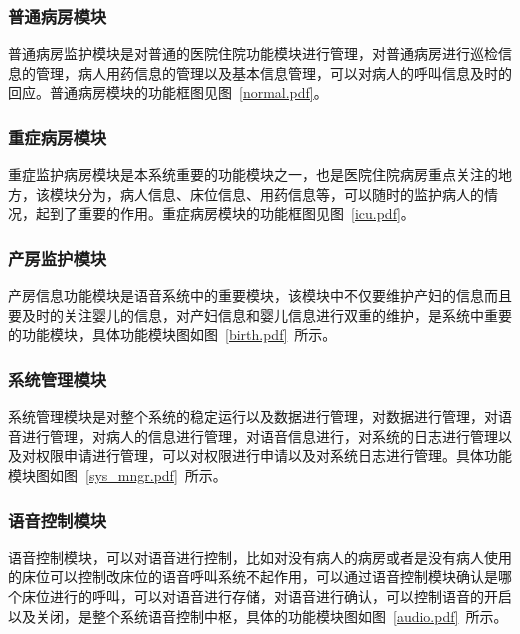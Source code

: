 \subsubsection{普通病房模块}
普通病房监护模块是对普通的医院住院功能模块进行管理，对普通病房进行巡检信息的管理，病人用药信息的管理以及基本信息管理，可以对病人的呼叫信息及时的回应。普通病房模块的功能框图见图~\ref{normal.pdf}。

\subsubsection{重症病房模块}
重症监护病房模块是本系统重要的功能模块之一，也是医院住院病房重点关注的地方，该模块分为，病人信息、床位信息、用药信息等，可以随时的监护病人的情况，起到了重要的作用。重症病房模块的功能框图见图~\ref{icu.pdf}。

\subsubsection{产房监护模块}
产房信息功能模块是语音系统中的重要模块，该模块中不仅要维护产妇的信息而且要及时的关注婴儿的信息，对产妇信息和婴儿信息进行双重的维护，是系统中重要的功能模块，具体功能模块图如图~\ref{birth.pdf}~所示。

\subsubsection{系统管理模块}
系统管理模块是对整个系统的稳定运行以及数据进行管理，对数据进行管理，对语音进行管理，对病人的信息进行管理，对语音信息进行，对系统的日志进行管理以及对权限申请进行管理，可以对权限进行申请以及对系统日志进行管理。具体功能模块图如图~\ref{sys_mngr.pdf}~所示。
	
\subsubsection{语音控制模块}
语音控制模块，可以对语音进行控制，比如对没有病人的病房或者是没有病人使用的床位可以控制改床位的语音呼叫系统不起作用，可以通过语音控制模块确认是哪个床位进行的呼叫，可以对语音进行存储，对语音进行确认，可以控制语音的开启以及关闭，是整个系统语音控制中枢，具体的功能模块图如图~\ref{audio.pdf}~所示。

